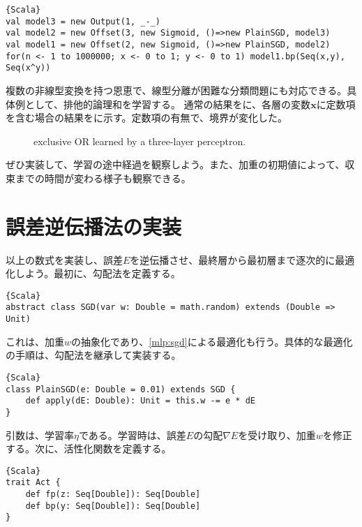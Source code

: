 \documentclass[10pt,a4paper]{book}
\begin{document}
\begin{Verbatim}{Scala}
val model3 = new Output(1, _-_)
val model2 = new Offset(3, new Sigmoid, ()=>new PlainSGD, model3)
val model1 = new Offset(2, new Sigmoid, ()=>new PlainSGD, model2)
for(n <- 1 to 1000000; x <- 0 to 1; y <- 0 to 1) model1.bp(Seq(x,y), Seq(x^y))
\end{Verbatim}

複数の非線型変換を持つ恩恵で、線型分離が困難な分類問題にも対応できる。具体例として、排他的論理和を学習する。
通常の結果をに、各層の変数$\bm{x}$に定数項を含む場合の結果をに示す。定数項の有無で、境界が変化した。

\begin{figure}[h]
\centering
{}
\caption{exclusive OR learned by a three-layer perceptron.\label{fig:mlp.split}}
\end{figure}

ぜひ実装して、学習の途中経過を観察しよう。また、加重の初期値によって、収束までの時間が変わる様子も観察できる。

\section{誤差逆伝播法の実装\label{sect:chain}}

以上の数式を実装し、誤差$E$を逆伝播させ、最終層から最初層まで逐次的に最適化しよう。最初に、勾配法を定義する。

\begin{Verbatim}{Scala}
abstract class SGD(var w: Double = math.random) extends (Double => Unit)
\end{Verbatim}

これは、加重$w$の抽象化であり、\eqref{mlp:sgd}による最適化も行う。具体的な最適化の手順は、勾配法を継承して実装する。

\begin{Verbatim}{Scala}
class PlainSGD(e: Double = 0.01) extends SGD {
	def apply(dE: Double): Unit = this.w -= e * dE
}
\end{Verbatim}

引数は、学習率$\eta$である。学習時は、誤差$E$の勾配$\nabla E$を受け取り、加重$w$を修正する。次に、活性化関数を定義する。

\begin{Verbatim}{Scala}
trait Act {
	def fp(z: Seq[Double]): Seq[Double]
	def bp(y: Seq[Double]): Seq[Double]
}
\end{Verbatim}
\end{document}
